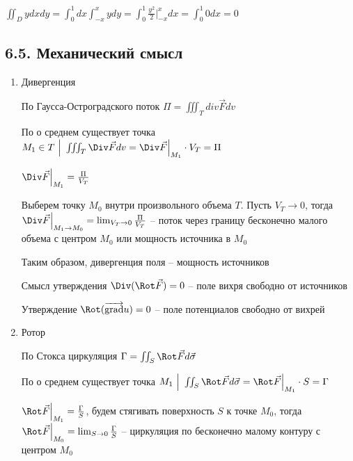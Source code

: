 \documentclass[12pt]{article}
\begin{document}
    $\iint_D y dxdy = \int_0^1 dx \int_{-x}^{x} y dy = \int_0^1 \frac{y^2}{2} \Big|_{-x}^{x} dx = \int_0^1 0 dx = 0$

    \subsection{6.5. Механический смысл}

    \hypertarget{divergencemechanicalmeaning}{}

    \begin{enumerate}[label*=\arabic** ]
        \item Дивергенция

        По \Ths Гаусса-Остроградского поток $\Pi = \iiint_T div \vec{F} dv$

        По \Ths о среднем существует точка $M_1 \in T \ \Big| \ \iiint_T \Div \vec{F} dv = \Div \vec{F} \Big|_{M_1} \cdot V_T = \Pi$

        $\Div \vec{F} \Big|_{M_1} = \frac{\Pi}{V_T}$

        Выберем точку $M_0$ внутри произвольного объема $T$. 
        Пусть $V_T \to 0$, тогда $\Div \vec{F} \Big|_{M_1 \to M_0} = \lim_{V_T \to 0} \frac{\Pi}{V_T}$ -- поток через границу бесконечно малого объема с центром $M_0$ или мощность источника в $M_0$

        Таким образом, дивергенция поля -- мощность источников

        \Notas Смысл утверждения $\Div (\Rot \vec F) = 0$ -- поле вихря свободно от источников

        \Notas Утверждение $\Rot (\overrightarrow{\operatorname{grad}} u) = 0$ -- поле потенциалов свободно от вихрей

        \mediumvspace

        \hypertarget{rotormechanicalmeaning}{}

        \item Ротор

        По \Ths Стокса циркуляция $\Gamma = \iint_S \Rot \vec{F} d\vec{\sigma}$

        По \Ths о среднем существует точка $M_1 \ \Big| \ \iint_S \Rot \vec{F} d\vec{\sigma} = \Rot \vec{F} \Big|_{M_1} \cdot S = \Gamma$

        $\Rot \vec{F} \Big|_{M_1} = \frac{\Gamma}{S}$, будем стягивать поверхность $S$ к точке $M_0$, тогда $\Rot \vec{F} \Big|_{M_0} = \lim_{S \to 0} \frac{\Gamma}{S}$ -- циркуляция по бесконечно малому контуру с центром $M_0$
    \end{enumerate}
\end{document}
